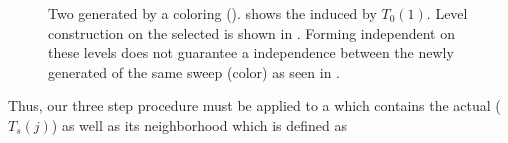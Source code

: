      \begin{figure}[t]
     	\centering
     	\hspace{0.6em}
     	\hspace{0.6em}
     	\hspace{0.6em}
     	\caption{Two \levelGroups generated by a \DTWO coloring ().  shows the \subgraph induced by \levelGroup $T_0(1)$. Level construction on the selected \subgraph is shown in . Forming \DTWO independent \levelGroups on these levels does not guarantee a \DTWO independence between the newly generated \levelGroups of the same sweep (color) as seen in .}
     	\label{fig:rec_d2_wrong}
     \end{figure}
Thus, our three step procedure must be applied to a \subgraph which contains the actual \levelGroup ($T_s(j)$) as well as its \DKM neighborhood which is defined as 
